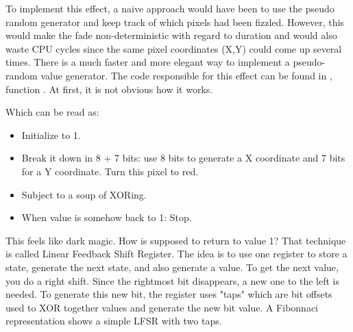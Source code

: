 To implement this effect, a naive approach would have been to use the pseudo random generator  and keep track of which pixels had been fizzled. However, this would make the fade non-deterministic with regard to duration and would also waste CPU cycles since the same pixel coordinates (X,Y) could come up several times. There is a much faster and more elegant way to implement a pseudo-random value generator. The code responsible for this effect can be found in , function . At first, it is not obvious how it works.\\
\par
\begin{minipage}{\textwidth}

\end{minipage}
\par
Which can be read as:\\
\begin{itemize}
\item Initialize  to 1.
\item Break it down in 8 + 7 bits: use 8 bits to generate a X coordinate and 7 bits for a Y coordinate. Turn this pixel to red.
\item Subject  to a soup of XORing.
\item When  value is somehow back to 1: Stop.
\end{itemize}        
This feels like dark magic. How is  supposed to return to value 1? That technique is called Linear Feedback Shift Register. The idea is to use one register to store a state, generate the next state, and also generate a value. To get the next value, you do a right shift. Since the rightmost bit disappears, a new one to the left is needed. To generate this new bit, the register uses "taps" which are bit offsets used to XOR together values and generate the new bit value. A Fibonnaci representation shows a simple LFSR with two taps.\\
\par

